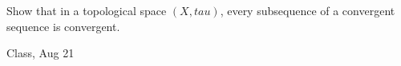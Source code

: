 \begin{samepage}
\begin{ex}
Show that in a topological space $(X, tau)$, every subsequence of a convergent sequence is convergent.
\end{ex}
\begin{source}
Class, Aug 21
\end{source}
\end{samepage}
